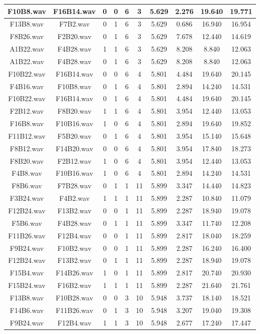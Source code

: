 \documentclass[11pt,a4paper,twoside]{book}
\begin{document}
\begin{longtable}[c]{|c|c|c|c|c|c|c|c|c|c|}
F10B8.wav&F16B14.wav&0&0&6&3&5.629&2.276&19.640&19.771\\ \hline
F13B8.wav&F7B2.wav&0&1&6&3&5.629&0.686&16.940&16.954\\ \hline
F8B26.wav&F2B20.wav&0&1&6&3&5.629&7.678&12.440&14.619\\ \hline
A1B22.wav&F4B28.wav&1&1&6&3&5.629&8.208&8.840&12.063\\ \hline
A1B22.wav&F4B28.wav&0&1&6&3&5.629&8.208&8.840&12.063\\ \hline
F10B22.wav&F16B14.wav&0&0&6&4&5.801&4.484&19.640&20.145\\ \hline
F4B16.wav&F10B8.wav&0&1&6&4&5.801&2.894&14.240&14.531\\ \hline
F10B22.wav&F16B14.wav&0&1&6&4&5.801&4.484&19.640&20.145\\ \hline
F2B12.wav&F8B20.wav&1&1&6&4&5.801&3.954&12.440&13.053\\ \hline
F16B8.wav&F10B16.wav&1&0&6&4&5.801&2.894&19.640&19.852\\ \hline
F11B12.wav&F5B20.wav&0&1&6&4&5.801&3.954&15.140&15.648\\ \hline
F8B12.wav&F14B20.wav&0&0&6&4&5.801&3.954&17.840&18.273\\ \hline
F8B20.wav&F2B12.wav&1&0&6&4&5.801&3.954&12.440&13.053\\ \hline
F4B8.wav&F10B16.wav&1&0&6&4&5.801&2.894&14.240&14.531\\ \hline
F8B6.wav&F7B28.wav&0&1&1&11&5.899&3.347&14.440&14.823\\ \hline
F3B24.wav&F4B2.wav&1&1&1&11&5.899&2.287&10.840&11.079\\ \hline
F12B24.wav&F13B2.wav&0&0&1&11&5.899&2.287&18.940&19.078\\ \hline
F5B6.wav&F4B28.wav&0&1&1&11&5.899&3.347&11.740&12.208\\ \hline
F11B26.wav&F12B4.wav&0&0&1&11&5.899&2.817&18.040&18.259\\ \hline
F9B24.wav&F10B2.wav&0&0&1&11&5.899&2.287&16.240&16.400\\ \hline
F12B24.wav&F13B2.wav&0&1&1&11&5.899&2.287&18.940&19.078\\ \hline
F15B4.wav&F14B26.wav&1&0&1&11&5.899&2.817&20.740&20.930\\ \hline
F15B24.wav&F16B2.wav&1&1&1&11&5.899&2.287&21.640&21.761\\ \hline
F13B8.wav&F10B28.wav&0&0&3&10&5.948&3.737&18.140&18.521\\ \hline
F14B6.wav&F11B26.wav&0&1&3&10&5.948&3.207&19.040&19.308\\ \hline
F9B24.wav&F12B4.wav&1&1&3&10&5.948&2.677&17.240&17.447\\ \hline

\end{longtable}
\end{document}
